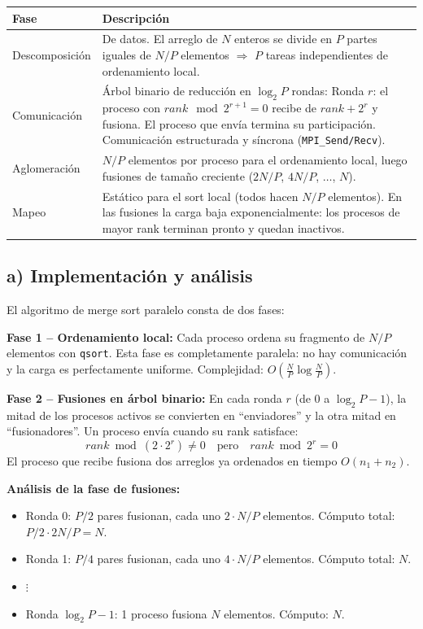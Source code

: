 \documentclass[12pt,a4paper]{article}
\begin{document}
\begin{tabular}{L{3cm} L{11cm}}
\toprule
\textbf{Fase} & \textbf{Descripción} \\
\midrule
Descomposición & De datos. El arreglo de $N$ enteros se divide en $P$ partes
  iguales de $N/P$ elementos $\Rightarrow$ $P$ tareas independientes de
  ordenamiento local. \\[4pt]
Comunicación & Árbol binario de reducción en $\log_2 P$ rondas:
  Ronda $r$: el proceso con $rank \mod 2^{r+1} = 0$ recibe de $rank + 2^r$
  y fusiona. El proceso que envía termina su participación.
  Comunicación estructurada y síncrona (\texttt{MPI\_Send/Recv}). \\[4pt]
Aglomeración & $N/P$ elementos por proceso para el ordenamiento local,
  luego fusiones de tamaño creciente ($2N/P$, $4N/P$, $\ldots$, $N$). \\[4pt]
Mapeo & Estático para el sort local (todos hacen $N/P$ elementos). En las
  fusiones la carga baja exponencialmente: los procesos de mayor rank terminan
  pronto y quedan inactivos. \\
\bottomrule
\end{tabular}

\vspace{0.5cm}

\subsection{a) Implementación y análisis}

El algoritmo de merge sort paralelo consta de dos fases:

\textbf{Fase 1 -- Ordenamiento local:} Cada proceso ordena su fragmento de $N/P$
elementos con \texttt{qsort}. Esta fase es completamente paralela: no hay comunicación
y la carga es perfectamente uniforme. Complejidad: $O\!\left(\frac{N}{P} \log \frac{N}{P}\right)$.

\textbf{Fase 2 -- Fusiones en árbol binario:} En cada ronda $r$ (de 0 a $\log_2 P - 1$),
la mitad de los procesos activos se convierten en ``enviadores'' y la otra mitad en
``fusionadores''. Un proceso envía cuando su rank satisface:
\[
  rank \bmod (2 \cdot 2^r) \neq 0 \quad \text{pero} \quad rank \bmod 2^r = 0
\]
El proceso que recibe fusiona dos arreglos ya ordenados en tiempo $O(n_1 + n_2)$.

\textbf{Análisis de la fase de fusiones:}
\begin{itemize}
  \item Ronda 0: $P/2$ pares fusionan, cada uno $2 \cdot N/P$ elementos. Cómputo total: $P/2 \cdot 2N/P = N$.
  \item Ronda 1: $P/4$ pares fusionan, cada uno $4 \cdot N/P$ elementos. Cómputo total: $N$.
  \item $\vdots$
  \item Ronda $\log_2 P - 1$: 1 proceso fusiona $N$ elementos. Cómputo: $N$.
\end{itemize}
\end{document}
